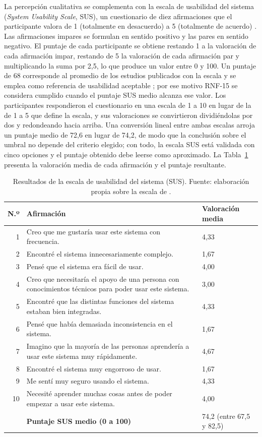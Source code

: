 La percepción cualitativa se complementa con la escala de usabilidad del sistema (\emph{System Usability Scale}, SUS), un cuestionario de diez afirmaciones que el participante valora de 1 (totalmente en desacuerdo) a 5 (totalmente de acuerdo) \parencite{Brooke1996}. Las afirmaciones impares se formulan en sentido positivo y las pares en sentido negativo. El puntaje de cada participante se obtiene restando 1 a la valoración de cada afirmación impar, restando de 5 la valoración de cada afirmación par y multiplicando la suma por 2,5, lo que produce un valor entre 0 y 100. Un puntaje de 68 corresponde al promedio de los estudios publicados con la escala y se emplea como referencia de usabilidad aceptable \parencite{Sauro2011}; por ese motivo RNF-15 se considera cumplido cuando el puntaje SUS medio alcanza ese valor. Los participantes respondieron el cuestionario en una escala de 1 a 10 en lugar de la de 1 a 5 que define la escala, y sus valoraciones se convirtieron dividiéndolas por dos y redondeando hacia arriba. Una conversión lineal entre ambas escalas arroja un puntaje medio de 72,6 en lugar de 74,2, de modo que la conclusión sobre el umbral no depende del criterio elegido; con todo, la escala SUS está validada con cinco opciones y el puntaje obtenido debe leerse como aproximado. La Tabla~\ref{tab:sus} presenta la valoración media de cada afirmación y el puntaje resultante.

\begin{table}[t]
  \centering
  \small
  \caption{Resultados de la escala de usabilidad del sistema (SUS). Fuente: elaboración propia sobre la escala de \textcite{Brooke1996}.}
  \label{tab:sus}
  \begin{tabular}{@{}r p{9.8cm} p{4cm}@{}}
    \hline
    \textbf{N.º} & \textbf{Afirmación} & \textbf{Valoración media} \\
    \hline
    1 & Creo que me gustaría usar este sistema con frecuencia. & 4,33 \\
    2 & Encontré el sistema innecesariamente complejo. & 1,67 \\
    3 & Pensé que el sistema era fácil de usar. & 4,00 \\
    4 & Creo que necesitaría el apoyo de una persona con conocimientos técnicos para poder usar este sistema. & 3,00 \\
    5 & Encontré que las distintas funciones del sistema estaban bien integradas. & 4,33 \\
    6 & Pensé que había demasiada inconsistencia en el sistema. & 1,67 \\
    7 & Imagino que la mayoría de las personas aprendería a usar este sistema muy rápidamente. & 4,67 \\
    8 & Encontré el sistema muy engorroso de usar. & 1,67 \\
    9 & Me sentí muy seguro usando el sistema. & 4,33 \\
    10 & Necesité aprender muchas cosas antes de poder empezar a usar este sistema. & 4,00 \\
    \hline
    & \textbf{Puntaje SUS medio (0 a 100)} & 74,2 (entre 67,5 y 82,5) \\
    \hline
  \end{tabular}
\end{table}


